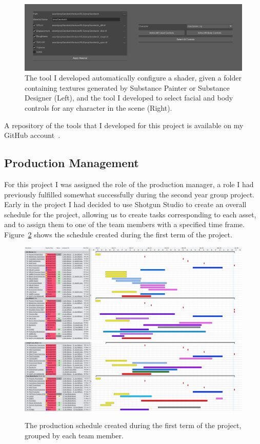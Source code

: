\documentclass[11pt]{article}
\begin{document}
\begin{figure}[htbp]
\centering
\includegraphics[width=1.0\linewidth]{images/miscScripts.png}
\caption{\label{figure:miscScripts} The tool I developed automatically configure a shader, given a folder containing textures generated by Substance Painter or Substance Designer (Left), and the tool I developed to select facial and body controls for any character in the scene (Right).}
\end{figure}

A repository of the tools that I developed for this project is available on my GitHub account~\cite{myGitHub}.

\subsection{Production Management} \label{productionManagement}

For this project I was assigned the role of the production manager, a role I had previously fulfilled somewhat successfully during the second year group project. Early in the project I had decided to use Shotgun Studio to create an overall schedule for the project, allowing us to create tasks corresponding to each asset, and to assign them to one of the team members with a specified time frame. Figure~\ref{figure:schedule} shows the schedule created during the first term of the project.

\begin{figure}[htbp]
\centering
\includegraphics[width=1.0\linewidth]{images/schedule01.png}
\includegraphics[width=1.0\linewidth]{images/schedule02.png}
\caption{\label{figure:schedule} The production schedule created during the first term of the project, grouped by each team member.}
\end{figure}
\end{document}
